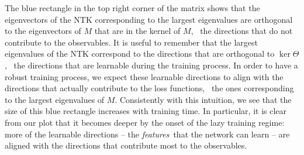 The blue rectangle in the top right corner of the matrix shows that the eigenvectors
of the NTK corresponding to the largest eigenvalues are orthogonal to the eigenvectors
of $M$ that are in the kernel of $M$, \ie\ the directions that do not contribute to the 
observables. It is useful to remember that the largest eigenvalues of the NTK correspond 
to the directions that are orthogonal to $\ker\Theta$, \ie\ the directions that are learnable
during the training process. In order to have a robust training process, we expect these 
learnable directions to align with the directions that actually contribute to the loss 
functions, \ie\ the ones corresponding to the largest eigenvalues of $M$. Consistently with 
this intuition, we see that the size of this blue rectangle increases with training time. 
In particular, it is clear from our plot that it becomes deeper by the onset of the lazy 
training regime: more of the learnable directions -- the {\it features}\ that the network 
can learn -- are aligned with the directions that contribute most to the observables. 

\FloatBarrier
